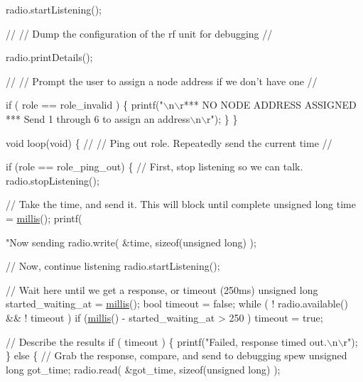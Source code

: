 \begin{DoxyCodeInclude}
{{  radio.startListening();

  \textcolor{comment}{//}
  \textcolor{comment}{// Dump the configuration of the rf unit for debugging}
  \textcolor{comment}{//}

  radio.printDetails();

  \textcolor{comment}{//}
  \textcolor{comment}{// Prompt the user to assign a node address if we don't have one}
  \textcolor{comment}{//}

  \textcolor{keywordflow}{if} ( role == role\_invalid )
  \{
    printf(\textcolor{stringliteral}{"\(\backslash\)n\(\backslash\)r*** NO NODE ADDRESS ASSIGNED *** Send 1 through 6 to assign an address\(\backslash\)n\(\backslash\)r"});
  \}
\}

\textcolor{keywordtype}{void} loop(\textcolor{keywordtype}{void})
\{
  \textcolor{comment}{//}
  \textcolor{comment}{// Ping out role.  Repeatedly send the current time}
  \textcolor{comment}{//}

  \textcolor{keywordflow}{if} (role == role\_ping\_out)
  \{
    \textcolor{comment}{// First, stop listening so we can talk.}
    radio.stopListening();

    \textcolor{comment}{// Take the time, and send it.  This will block until complete}
    \textcolor{keywordtype}{unsigned} \textcolor{keywordtype}{long} time = \hyperlink{group__Porting__General_gad5b3ec1ce839fa1c4337a7d0312e9749}{millis}();
    printf(\textcolor{stringliteral}{"Now sending %
    radio.write( &time, \textcolor{keyword}{sizeof}(\textcolor{keywordtype}{unsigned} \textcolor{keywordtype}{long}) );

    \textcolor{comment}{// Now, continue listening}
    radio.startListening();

    \textcolor{comment}{// Wait here until we get a response, or timeout (250ms)}
    \textcolor{keywordtype}{unsigned} \textcolor{keywordtype}{long} started\_waiting\_at = \hyperlink{group__Porting__General_gad5b3ec1ce839fa1c4337a7d0312e9749}{millis}();
    \textcolor{keywordtype}{bool} timeout = \textcolor{keyword}{false};
    \textcolor{keywordflow}{while} ( ! radio.available() && ! timeout )
      \textcolor{keywordflow}{if} (\hyperlink{group__Porting__General_gad5b3ec1ce839fa1c4337a7d0312e9749}{millis}() - started\_waiting\_at > 250 )
        timeout = \textcolor{keyword}{true};

    \textcolor{comment}{// Describe the results}
    \textcolor{keywordflow}{if} ( timeout )
    \{
      printf(\textcolor{stringliteral}{"Failed, response timed out.\(\backslash\)n\(\backslash\)r"});
    \}
    \textcolor{keywordflow}{else}
    \{
      \textcolor{comment}{// Grab the response, compare, and send to debugging spew}
      \textcolor{keywordtype}{unsigned} \textcolor{keywordtype}{long} got\_time;
      radio.read( &got\_time, \textcolor{keyword}{sizeof}(\textcolor{keywordtype}{unsigned} \textcolor{keywordtype}{long}) );

}}}
\end{DoxyCodeInclude}
